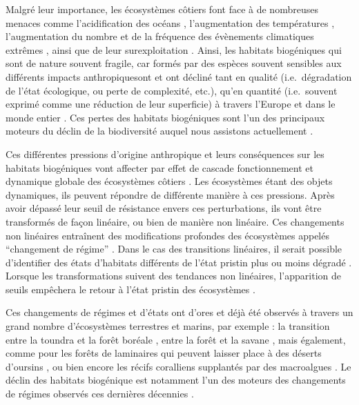 Malgré leur importance, les écosystèmes côtiers font face à de
nombreuses menaces comme l'acidification des océans
\autocite{Doney_2009}, l'augmentation des températures
\autocite{IPCC_2021_technical_summary}, l'augmentation du nombre et de
la fréquence des évènements climatiques extrêmes \autocite{Oliver_2018},
ainsi que de leur surexploitation \autocites[ ]{Lotze_2006}{Lotze_2009}.
Ainsi, les habitats biogéniques qui sont de nature souvent fragile, car
formés par des espèces souvent sensibles aux différents impacts
anthropiquesont et ont décliné tant en qualité (i.e.~dégradation de
l'état écologique, ou perte de complexité, etc.), qu'en quantité
(i.e.~souvent exprimé comme une réduction de leur superficie) à travers
l'Europe et dans le monde entier \autocites[ ]{Airoldi_2007}[
]{Dunic_2021}[ ]{McCauley_2015}{Waycott_2009}. Ces pertes des habitats
biogéniques sont l'un des principaux moteurs du déclin de la
biodiversité auquel nous assistons actuellement \autocites[
]{Airoldi_2007}[ ]{ipbes_2019}{McCauley_2015}.

Ces différentes pressions d'origine anthropique et leurs conséquences
sur les habitats biogéniques vont affecter par effet de cascade
fonctionnement et dynamique globale des écosystèmes côtiers \autocites[
]{Rocha_2015a}[ ]{Sara_2021}{Wernberg_2016}. Les écosystèmes étant des
objets dynamiques, ils peuvent répondre de différente manière à ces
pressions. Après avoir dépassé leur seuil de résistance envers ces
perturbations, ils vont être transformés de façon linéaire, ou bien de
manière non linéaire. Ces changements non linéaires entraînent des
modifications profondes des écosystèmes appelés ``changement de régime''
\autocite{Scheffer_2001}. Dans le cas des transitions linéaires, il
serait possible d'identifier des états d'habitats différents de l'état
pristin plus ou moins dégradé \autocite{Spake_2022}. Lorsque les
transformations suivent des tendances non linéaires, l'apparition de
seuils empêchera le retour à l'état pristin des écosystèmes
\autocite{Spake_2022}.

Ces changements de régimes et d'états ont d'ores et déjà été observés à
travers un grand nombre d'écosystèmes terrestres et marins, par exemple
: la transition entre la toundra et la forêt boréale
\autocite{Folke_2004}, entre la forêt et la savane \autocites[
]{Debra_2004}{Folke_2004}, mais également, comme pour les forêts de
laminaires qui peuvent laisser place à des déserts d'oursins \autocites[
]{Carnell_2020}{Rogers-Bennett_2019}, ou bien encore les récifs
coralliens supplantés par des macroalgues \autocites[
]{Folke_2004}{OBrien_2018}. Le déclin des habitats biogénique est
notamment l'un des moteurs des changements de régimes observés ces
dernières décennies \autocites[ ]{Rocha_2015a}{Wernberg_2016}.

